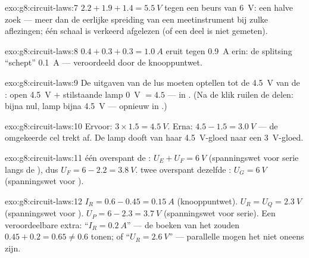 \begin{solution}{exo:g8:circuit-laws:7}
$2.2 + 1.9 + 1.4 = \qty{5.5}{V}$ tegen een beurs van \qty{6}{V}: een
halve  zoek --- meer dan de eerlijke spreiding van een
meetinstrument bij zulke aflezingen; één schaal is verkeerd afgelezen (of een
deel is niet gemeten).
\end{solution}

\begin{solution}{exo:g8:circuit-laws:8}
$0.4 + 0.3 + 0.3 = \qty{1.0}{A}$ eruit tegen \qty{0.9}{A} erin: de
splitsing ``schept'' \qty{0.1}{A} --- veroordeeld door de
knooppuntwet.
\end{solution}

\begin{solution}{exo:g8:circuit-laws:9}
De uitgaven van de lus moeten optellen tot de \qty{4.5}{V} van de
: open  \qty{4.5}{V} $+$
stilstaande lamp \qty{0}{V} $= 4.5$ --- in . (Na de klik
ruilen de delen:  bijna nul, lamp bijna \qty{4.5}{V}
--- opnieuw in .)
\end{solution}

\begin{solution}{exo:g8:circuit-laws:10}
Ervoor: $3 \times 1.5 = \qty{4.5}{V}$. Erna: $4.5 - 1.5 =
\qty{3.0}{V}$ --- de omgekeerde cel trekt af. De lamp dooft van haar
\qty{4.5}{V}-gloed naar een \qty{3}{V}-gloed.
\end{solution}

\begin{solution}{exo:g8:circuit-laws:11}
 één overspant de : $U_E + U_F =
\qty{6}{V}$ (spanningswet voor serie langs de ), dus
$U_F = 6 - 2.2 = \qty{3.8}{V}$.  twee overspant dezelfde
: $U_G = \qty{6}{V}$ (spanningswet voor ).
\end{solution}

\begin{solution}{exo:g8:circuit-laws:12}
$I_R = 0.6 - 0.45 = \qty{0.15}{A}$ (knooppuntwet). $U_R = U_Q
= \qty{2.3}{V}$ (spanningswet voor ). $U_P = 6 - 2.3 =
\qty{3.7}{V}$ (spanningswet voor serie). Een veroordeelbare extra:
``$I_R = \qty{0.2}{A}$'' --- de boeken van het  zouden
$0.45 + 0.2 = 0.65 \neq 0.6$ tonen; of ``$U_R = \qty{2.6}{V}$'' ---
parallelle  mogen het niet oneens zijn.
\end{solution}

